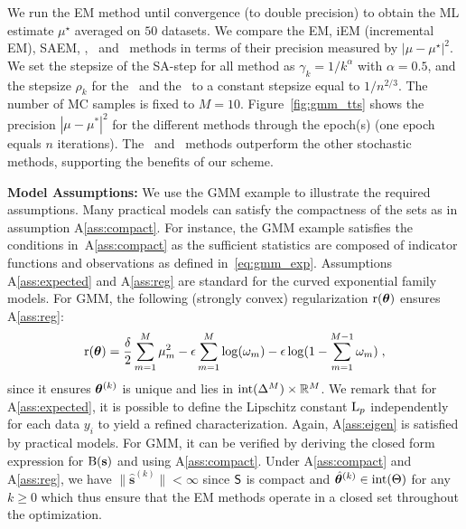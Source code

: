 \documentclass[bj]{imsart}
\numberwithin{equation}{section}
\theoremstyle{plain}
\begin{document}
We run the EM method until convergence (to double precision) to obtain the ML estimate $\mu^\star$ averaged on $50$ datasets. 
We compare the EM, iEM (incremental EM), SAEM, \ISAEM, \SAEMVR\ and \FISAEM\ methods in terms of their precision measured by $| \mu - \mu^\star |^2$. 
We set the stepsize of the {SA-step} for all method as $\gamma_k = 1/k^{\alpha}$ with $\alpha = 0.5$, and the stepsize $\rho_k$ for the \SAEMVR\ and the \FISAEM\ to a constant stepsize equal to $1/n^{2/3}$. 
The number of MC samples is fixed to $M=10$.
Figure~\ref{fig:gmm_tts} shows the precision $|\mu - \mu^*|^2$ for the different methods through the epoch(s) (one epoch equals $n$ iterations). 
The \SAEMVR\ and \FISAEM\ methods outperform the other stochastic methods, supporting the benefits of our scheme.

\vspace{0.1in}

\noindent \textbf{Model Assumptions:}
We use the GMM example to illustrate the required assumptions.
Many practical models can satisfy the compactness of the sets as in assumption A\ref{ass:compact}. 
For instance, the GMM example satisfies the conditions in~A\ref{ass:compact} as the sufficient statistics are composed of indicator functions and observations as defined in~\eqref{eq:gmm_exp}.
Assumptions A\ref{ass:expected} and A\ref{ass:reg} are standard for the curved exponential family models.
For GMM, the following (strongly convex) regularization $\Pen( \param )$ ensures A\ref{ass:reg}:
$$
\Pen( \param ) = \frac{\delta}{2} \sum_{m=1}^M \mu_m^2 - \epsilon \sum_{m=1}^M  \log ( \omega_m )  - \epsilon \log ( 1 - \sum_{m=1}^{M-1} \omega_m ) \eqsp,
$$
since it ensures $\param^{(k)}$ is unique and lies in ${\rm int}( \Delta^M ) \times \rset^M$.
We remark that for A\ref{ass:expected}, it is possible to define the Lipschitz constant $\Lip{p}$ independently for each data $y_i$ to yield a refined characterization. 
Again, A\ref{ass:eigen} is satisfied by practical models. For GMM, it can be verified by deriving the closed form expression for $\operatorname{B}( \bss )$ and using A\ref{ass:compact}.
Under A\ref{ass:compact} and A\ref{ass:reg}, we have $\| \hat{\bm s}^{(k)} \| < \infty$ since $\Sset$ is compact and $\hat{\param}^{(k)} \in {\rm int}( \Param )$ for any $k \geq 0$ which thus ensure that the EM methods operate in a closed set throughout the optimization.


\vspace{0.1in}
\end{document}
